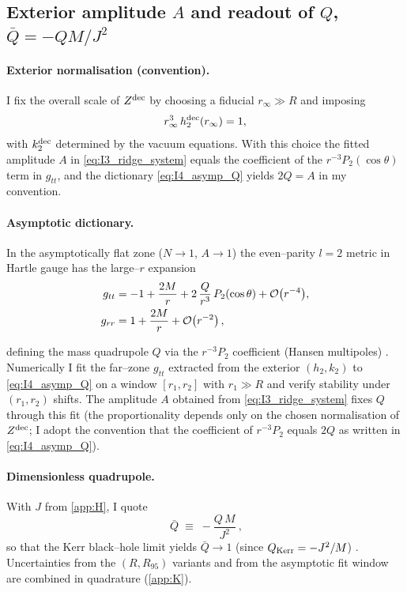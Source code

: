 \documentclass{iopjournal}
\begin{document}
\subsection{\texorpdfstring{Exterior amplitude $A$ and readout of $Q$, $\bar{Q}=-QM/J^{2}$}{Exterior amplitude A and readout of Q, Qbar = -Q M / J²}} \label{app:I4}


\paragraph{Exterior normalisation (convention).}
I fix the overall scale of $Z^{\rm dec}$ by choosing a fiducial $r_\infty\!\gg\!R$ and imposing
\begin{equation}
r_\infty^{3}\,h_2^{\rm dec}(r_\infty)=1,
\label{eq:I4_norm_dec}
\end{equation}
with $k_2^{\rm dec}$ determined by the vacuum equations. With this choice the fitted amplitude $A$ in \eqref{eq:I3_ridge_system} equals the coefficient of the $r^{-3}P_2(\cos\theta)$ term in $g_{tt}$, and the dictionary \eqref{eq:I4_asymp_Q} yields $2Q=A$ in my convention.

\paragraph{Asymptotic dictionary.}
In the asymptotically flat zone ($N\to1$, $A\to1$) the even–parity $l=2$ metric in Hartle gauge has the large–$r$ expansion
\begin{equation}
\begin{aligned}
g_{tt} &= -1 + \frac{2M}{r} + 2\,\frac{Q}{r^{3}}\,P_{2}(\cos\theta) + \order{r^{-4}},\\
g_{rr} &=  1 + \frac{2M}{r} + \order{r^{-2}}\,,
\end{aligned}
\label{eq:I4_asymp_Q}
\end{equation}

defining the mass quadrupole $Q$ via the $r^{-3}P_2$ coefficient (Hansen multipoles) \cite{HartleThorne1968,Hansen1974,PoissonWill2014}. Numerically I fit the far–zone $g_{tt}$ extracted from the exterior $(h_2,k_2)$ to \eqref{eq:I4_asymp_Q} on a window $[r_1,r_2]$ with $r_1\!\gg\!R$ and verify stability under $(r_1,r_2)$ shifts. The amplitude $A$ obtained from \eqref{eq:I3_ridge_system} fixes $Q$ through this fit (the proportionality depends only on the chosen normalisation of $Z^{\rm dec}$; I adopt the convention that the coefficient of $r^{-3}P_2$ equals $2Q$ as written in \eqref{eq:I4_asymp_Q}).

\paragraph{Dimensionless quadrupole.}
With $J$ from \cref{app:H}, I quote
\begin{equation}
\boxed{\ \bar{Q}\;\equiv\;-\frac{Q\,M}{J^{2}}\ },
\label{eq:I4_Qbar}
\end{equation}
so that the Kerr black–hole limit yields $\bar{Q}\to 1$ (since $Q_{\rm Kerr}=-J^{2}/M$) \cite{HartleThorne1968,Hansen1974}. Uncertainties from the $(R,R_{95})$ variants and from the asymptotic fit window are combined in quadrature (\cref{app:K}).
\end{document}
